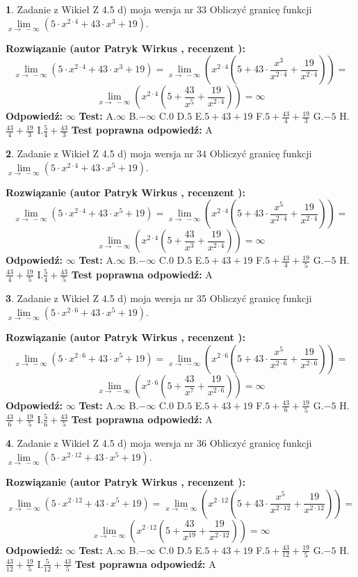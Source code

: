 \documentclass[12pt, a4paper]{article}
\theoremstyle{definition} %
\newtheorem{zad}{}
\newcommand{\zadStart}[1]{\begin{zad}#1\newline}
\newcommand{\zadStop}{\end{zad}}
\newcommand{\rozwStart}[2]{\noindent \textbf{Rozwiązanie (autor #1 , recenzent #2): }\newline}
\newcommand{\rozwStop}{\newline}
\newcommand{\odpStart}{\noindent \textbf{Odpowiedź:}\newline}
\newcommand{\odpStop}{\newline}
\newcommand{\testStart}{\noindent \textbf{Test:}\newline}
\newcommand{\testStop}{\newline}
\newcommand{\kluczStart}{\noindent \textbf{Test poprawna odpowiedź:}\newline}
\newcommand{\kluczStop}{\newline}
\begin{document}
\zadStart{Zadanie z Wikieł Z 4.5 d) moja wersja nr 33}
Obliczyć granicę funkcji  $\lim\limits_{x\to\ -\infty}(5 \cdot x^{2\cdot4}+43 \cdot x^{3}+19)$.
\zadStop
\rozwStart{Patryk Wirkus}{}
$$\lim\limits_{x\to\ -\infty}(5 \cdot x^{2\cdot4}+43 \cdot x^{3}+19) = \lim\limits_{x\to\ -\infty}(x^{2\cdot4}(5 +43 \cdot \frac{x^{3}}{x^{2\cdot4}}+\frac{19}{x^{2\cdot4}})) =$$ $$\lim\limits_{x\to\ -\infty}(x^{2\cdot4}(5 +\frac{43}{x^{5}}+\frac{19}{x^{2\cdot4}})) =\infty$$
\rozwStop
\odpStart
$\infty$
\odpStop
\testStart
A.$\infty$ B.$-\infty$ C.$0$ D.$5$ E.$5 + 43 + 19$
F.$5+\frac{43}{4}+\frac{19}{3}$ G.$-5$
H.$\frac{43}{4}+\frac{19}{3}$
I.$\frac{5}{4}+\frac{43}{3}$
\testStop
\kluczStart
A
\kluczStop



\zadStart{Zadanie z Wikieł Z 4.5 d) moja wersja nr 34}
Obliczyć granicę funkcji  $\lim\limits_{x\to\ -\infty}(5 \cdot x^{2\cdot4}+43 \cdot x^{5}+19)$.
\zadStop
\rozwStart{Patryk Wirkus}{}
$$\lim\limits_{x\to\ -\infty}(5 \cdot x^{2\cdot4}+43 \cdot x^{5}+19) = \lim\limits_{x\to\ -\infty}(x^{2\cdot4}(5 +43 \cdot \frac{x^{5}}{x^{2\cdot4}}+\frac{19}{x^{2\cdot4}})) =$$ $$\lim\limits_{x\to\ -\infty}(x^{2\cdot4}(5 +\frac{43}{x^{3}}+\frac{19}{x^{2\cdot4}})) =\infty$$
\rozwStop
\odpStart
$\infty$
\odpStop
\testStart
A.$\infty$ B.$-\infty$ C.$0$ D.$5$ E.$5 + 43 + 19$
F.$5+\frac{43}{4}+\frac{19}{5}$ G.$-5$
H.$\frac{43}{4}+\frac{19}{5}$
I.$\frac{5}{4}+\frac{43}{5}$
\testStop
\kluczStart
A
\kluczStop



\zadStart{Zadanie z Wikieł Z 4.5 d) moja wersja nr 35}
Obliczyć granicę funkcji  $\lim\limits_{x\to\ -\infty}(5 \cdot x^{2\cdot6}+43 \cdot x^{5}+19)$.
\zadStop
\rozwStart{Patryk Wirkus}{}
$$\lim\limits_{x\to\ -\infty}(5 \cdot x^{2\cdot6}+43 \cdot x^{5}+19) = \lim\limits_{x\to\ -\infty}(x^{2\cdot6}(5 +43 \cdot \frac{x^{5}}{x^{2\cdot6}}+\frac{19}{x^{2\cdot6}})) =$$ $$\lim\limits_{x\to\ -\infty}(x^{2\cdot6}(5 +\frac{43}{x^{7}}+\frac{19}{x^{2\cdot6}})) =\infty$$
\rozwStop
\odpStart
$\infty$
\odpStop
\testStart
A.$\infty$ B.$-\infty$ C.$0$ D.$5$ E.$5 + 43 + 19$
F.$5+\frac{43}{6}+\frac{19}{5}$ G.$-5$
H.$\frac{43}{6}+\frac{19}{5}$
I.$\frac{5}{6}+\frac{43}{5}$
\testStop
\kluczStart
A
\kluczStop



\zadStart{Zadanie z Wikieł Z 4.5 d) moja wersja nr 36}
Obliczyć granicę funkcji  $\lim\limits_{x\to\ -\infty}(5 \cdot x^{2\cdot12}+43 \cdot x^{5}+19)$.
\zadStop
\rozwStart{Patryk Wirkus}{}
$$\lim\limits_{x\to\ -\infty}(5 \cdot x^{2\cdot12}+43 \cdot x^{5}+19) = \lim\limits_{x\to\ -\infty}(x^{2\cdot12}(5 +43 \cdot \frac{x^{5}}{x^{2\cdot12}}+\frac{19}{x^{2\cdot12}})) =$$ $$\lim\limits_{x\to\ -\infty}(x^{2\cdot12}(5 +\frac{43}{x^{19}}+\frac{19}{x^{2\cdot12}})) =\infty$$
\rozwStop
\odpStart
$\infty$
\odpStop
\testStart
A.$\infty$ B.$-\infty$ C.$0$ D.$5$ E.$5 + 43 + 19$
F.$5+\frac{43}{12}+\frac{19}{5}$ G.$-5$
H.$\frac{43}{12}+\frac{19}{5}$
I.$\frac{5}{12}+\frac{43}{5}$
\testStop
\kluczStart
A
\kluczStop
\end{document}

